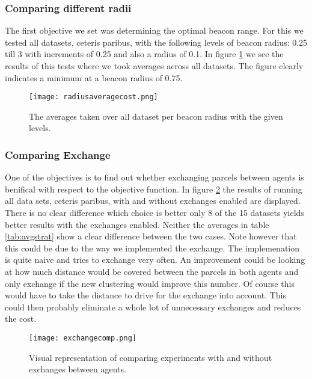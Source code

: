 \documentclass[../main.tex]{subfiles}
\begin{document}
\subsubsection{Comparing different radii}
The first objective we set was determining the optimal beacon range.
For this we tested all datasets, ceteris paribus, with the following levels of beacon radius: 0.25 till 3 with increments of 0.25 and also a radius of 0.1.
In figure \ref{fig:rad} we see the results of this tests where we took averages across all datasets.
The figure clearly indicates a minimum at a beacon radius of 0.75.
\begin{figure}
	\centering
	\texttt{[image: radiusaveragecost.png]}
	\caption{The averages taken over all dataset per beacon radius with the given levels.}
	\label{fig:rad}
\end{figure}

\subsubsection{Comparing Exchange}
One of the objectives is to find out whether exchanging parcels between agents is benifical with respect to the objective function.
In figure \ref{fig:exch} the results of running all data sets, ceteris paribus, with and without exchanges enabled are displayed.
There is no clear difference which choice is better only 8 of the 15 datasets yields better results with the exchanges enabled.
Neither the averages in table \ref{tab:avgstrat} show a clear difference between the two cases.
Note however that this could be due to the way we implemented the exchange.
The implemenation is quite naive and tries to exchange very often.
An improvement could be looking at how much distance would be covered between the parcels in both agents and only exchange if the new clustering would improve this number.
Of course this would have to take the distance to drive for the exchange into account.
This could then probably eliminate a whole lot of unnecessary exchanges and reduces the cost.

\begin{figure}
	\centering
	\texttt{[image: exchangecomp.png]}
	\caption{Visual representation of comparing experiments with and without exchanges between agents.}
	\label{fig:exch}
\end{figure}
\end{document}
